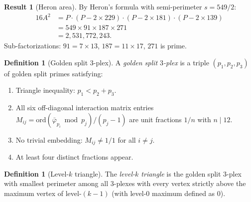 \documentclass[12pt,oneside]{article}
\theoremstyle{principia}
\theoremstyle{definition}
\newtheorem{definition}[theorem]{Definition}
\newtheorem{result}[theorem]{Result}
\theoremstyle{remark}
\begin{document}
\begin{result}[Heron area]
By Heron's formula with semi-perimeter $s = 549/2$:
\begin{align}
  16 A^2 &= P \cdot (P - 2 \times 229) \cdot (P - 2 \times 181)
    \cdot (P - 2 \times 139) \\
  &= 549 \times 91 \times 187 \times 271 \\
  &= 2{,}531{,}772{,}243.
\end{align}
Sub-factorizations: $91 = 7 \times 13$, $187 = 11 \times 17$,
$271$ is prime.
\end{result}

\begin{definition}[Golden split $3$-plex]
\label{def:3plex}
A \emph{golden split $3$-plex} is a triple $(p_1, p_2, p_3)$ of
golden split primes satisfying:
\begin{enumerate}
\item Triangle inequality: $p_1 < p_2 + p_3$.
\item All six off-diagonal interaction matrix entries $M_{ij} =
  \mathrm{ord}(\bar\varphi_{p_i} \bmod p_j) / (p_j - 1)$
  are unit fractions $1/n$ with $n \mid 12$.
\item No trivial embedding: $M_{ij} \neq 1/1$ for all $i \neq j$.
\item At least four distinct fractions appear.
\end{enumerate}
\end{definition}

\begin{definition}[Level-$k$ triangle]
\label{def:level}
The \emph{level-$k$ triangle} is the golden split $3$-plex with
smallest perimeter among all $3$-plexes with every vertex strictly
above the maximum vertex of level-$(k-1)$ (with level-$0$ maximum
defined as $0$).
\end{definition}
\end{document}
